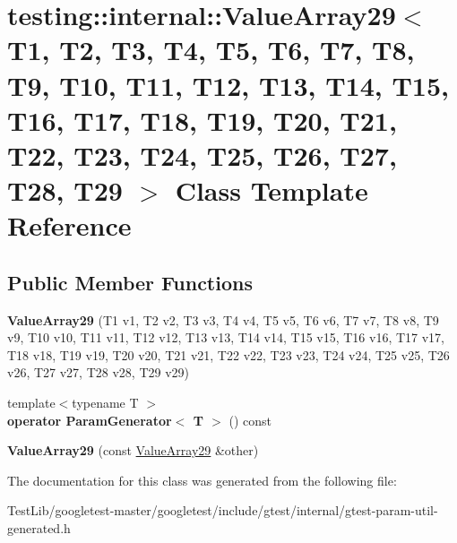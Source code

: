 \hypertarget{classtesting_1_1internal_1_1ValueArray29}{}\section{testing\+:\+:internal\+:\+:Value\+Array29$<$ T1, T2, T3, T4, T5, T6, T7, T8, T9, T10, T11, T12, T13, T14, T15, T16, T17, T18, T19, T20, T21, T22, T23, T24, T25, T26, T27, T28, T29 $>$ Class Template Reference}
\label{classtesting_1_1internal_1_1ValueArray29}
\subsection*{Public Member Functions}
\begin{DoxyCompactItemize}
\item 
\mbox{\label{classtesting_1_1internal_1_1ValueArray29_abd74fbc38f76f1e3baf28db3b6daa21a}} 
{\bfseries Value\+Array29} (T1 v1, T2 v2, T3 v3, T4 v4, T5 v5, T6 v6, T7 v7, T8 v8, T9 v9, T10 v10, T11 v11, T12 v12, T13 v13, T14 v14, T15 v15, T16 v16, T17 v17, T18 v18, T19 v19, T20 v20, T21 v21, T22 v22, T23 v23, T24 v24, T25 v25, T26 v26, T27 v27, T28 v28, T29 v29)
\item 
\mbox{\label{classtesting_1_1internal_1_1ValueArray29_ace48d673ae6e563b5bf1ceaa2512ad42}} 
{\footnotesize template$<$typename T $>$ }\\{\bfseries operator Param\+Generator$<$ T $>$} () const
\item 
\mbox{\label{classtesting_1_1internal_1_1ValueArray29_a4e5b252f7ffcd6380acc012ccf59a0f4}} 
{\bfseries Value\+Array29} (const \hyperlink{classtesting_1_1internal_1_1ValueArray29}{Value\+Array29} \&other)
\end{DoxyCompactItemize}


The documentation for this class was generated from the following file\+:\begin{DoxyCompactItemize}
\item 
Test\+Lib/googletest-\/master/googletest/include/gtest/internal/gtest-\/param-\/util-\/generated.\+h\end{DoxyCompactItemize}
